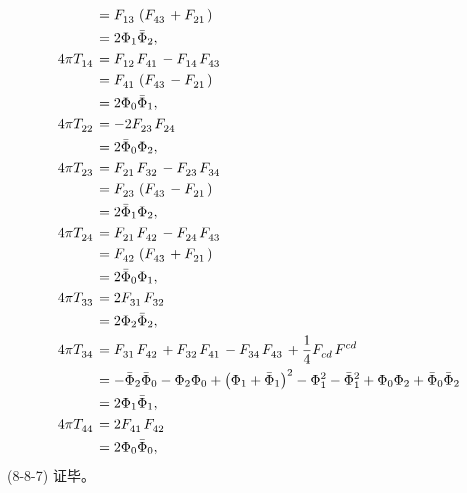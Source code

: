 \begin{xiti}
\begin{zm}
\begin{align*}
			&= \tensor{F}{_1_3} \left( \tensor{F}{_4_3} + \tensor{F}{_2_1} \right)\\
			&= 2 \Phi_1 \bar{\Phi}_2,\\
			4 \pi \tensor{T}{_1_4} &= \tensor{F}{_1_2} \tensor{F}{_4_1} - \tensor{F}{_1_4} \tensor{F}{_4_3}\\
			&= \tensor{F}{_4_1} \left( \tensor{F}{_4_3} - \tensor{F}{_2_1} \right)\\
			&= 2 \Phi_0 \bar{\Phi}_1,\\
			4 \pi \tensor{T}{_2_2} &= - 2 \tensor{F}{_2_3} \tensor{F}{_2_4}\\
			&= 2 \bar{\Phi}_0 \Phi_2,\\
			4 \pi \tensor{T}{_2_3} &= \tensor{F}{_2_1} \tensor{F}{_3_2} - \tensor{F}{_2_3} \tensor{F}{_3_4}\\
			&= \tensor{F}{_2_3} \left( \tensor{F}{_4_3} - \tensor{F}{_2_1} \right)\\
			&= 2 \bar{\Phi}_1 \Phi_2,\\
			4 \pi \tensor{T}{_2_4} &= \tensor{F}{_2_1} \tensor{F}{_4_2} - \tensor{F}{_2_4} \tensor{F}{_4_3}\\
			&= \tensor{F}{_4_2} \left( \tensor{F}{_4_3} + \tensor{F}{_2_1} \right)\\
			&= 2 \bar{\Phi}_0 \Phi_1,\\
			4 \pi \tensor{T}{_3_3} &= 2 \tensor{F}{_3_1} \tensor{F}{_3_2}\\
			&= 2 \Phi_2 \bar{\Phi}_2,\\
			4 \pi \tensor{T}{_3_4} &= \tensor{F}{_3_1} \tensor{F}{_4_2} + \tensor{F}{_3_2} \tensor{F}{_4_1} - \tensor{F}{_3_4} \tensor{F}{_4_3} + \frac{1}{4} \tensor{F}{_c_d} \tensor{F}{^c^d}\\
			&= - \bar{\Phi}_2 \bar{\Phi}_0 - \Phi_2 \Phi_0 + \left( \Phi_1 + \bar{\Phi}_1 \right)^2 - \Phi_1^2 - \bar{\Phi}_1^2 + \Phi_0 \Phi_2 + \bar{\Phi}_0 \bar{\Phi}_2\\
			&= 2 \Phi_1 \bar{\Phi}_1,\\
			4 \pi \tensor{T}{_4_4} &= 2 \tensor{F}{_4_1} \tensor{F}{_4_2}\\
			&= 2 \Phi_0 \bar{\Phi}_0,
		\end{align*}
		(8-8-7) 证毕。


\end{zm}
\end{xiti}
